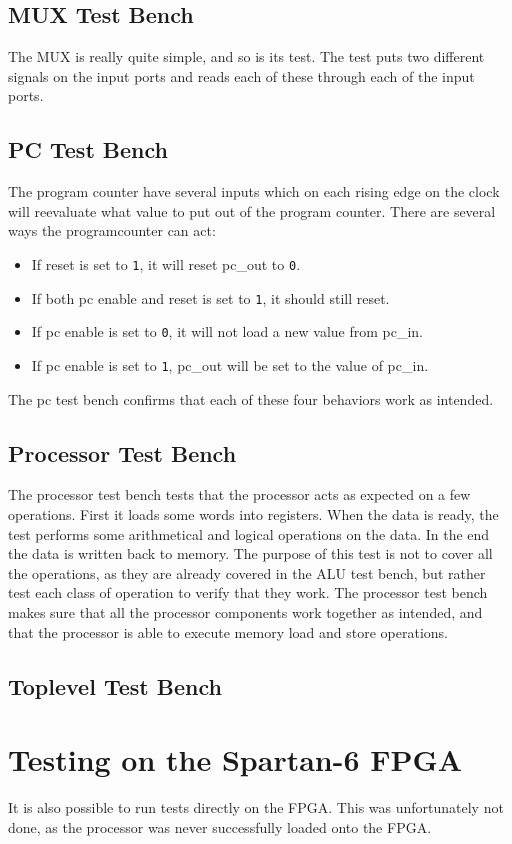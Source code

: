 \subsection{MUX Test Bench}

The MUX is really quite simple, and so is its test.
The test puts two different signals on the input ports and reads each of these through each of the input ports.

\subsection{PC Test Bench}

The program counter have several inputs which on each rising edge on the clock will reevaluate what value to put out of the program counter.
There are several ways the programcounter can act:
\begin{itemize}
\item{If reset is set to \texttt{1}, it will reset pc\_out to \texttt{0}.}
\item{If both pc enable and reset is set to \texttt{1}, it should still reset.}
\item{If pc enable is set to \texttt{0}, it will not load a new value from pc\_in.}
\item{If pc enable is set to \texttt{1}, pc\_out will be set to the value of pc\_in.}
\end{itemize}
The pc test bench confirms that each of these four behaviors work as intended.


\subsection{Processor Test Bench}

The processor test bench tests that the processor acts as expected on a few operations.
First it loads some words into registers.
When the data is ready, the test performs some arithmetical and logical operations on the data.
In the end the data is written back to memory.
The purpose of this test is not to cover all the operations, as they are already covered in the ALU test bench, but rather test each class of operation to verify that they work.
The processor test bench makes sure that all the processor components work together as intended, and that the processor is able to execute memory load and store operations.

\subsection{Toplevel Test Bench}



\section{Testing on the Spartan-6 FPGA}

It is also possible to run tests directly on the FPGA.
This was unfortunately not done, as the processor was never successfully loaded onto the FPGA.
